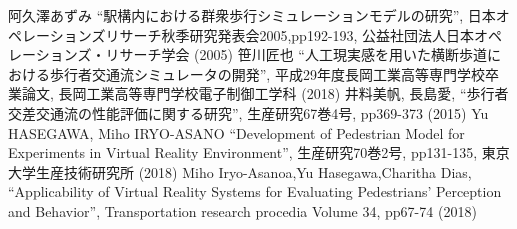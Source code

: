 ﻿%
\begin{thebibliography}{1}
 阿久澤あずみ
``駅構内における群衆歩行シミュレーションモデルの研究'', 日本オペレーションズリサーチ秋季研究発表会2005,pp192-193, 公益社団法人日本オペレーションズ・リサーチ学会
(2005)
 笹川匠也
``人工現実感を用いた横断歩道における歩行者交通流シミュレータの開発'', 平成29年度長岡工業高等専門学校卒業論文, 長岡工業高等専門学校電子制御工学科
(2018)
 井料美帆, 長島愛,
``歩行者交差交通流の性能評価に関する研究'', 生産研究67巻4号, pp369-373
(2015)
 Yu HASEGAWA, Miho IRYO-ASANO
``Development of Pedestrian Model for Experiments in Virtual Reality Environment'', 生産研究70巻2号, pp131-135, 東京大学生産技術研究所 (2018)
 Miho Iryo-Asanoa,Yu Hasegawa,Charitha Dias,
``Applicability of Virtual Reality Systems for Evaluating Pedestrians’ Perception and Behavior'', Transportation research procedia Volume 34, pp67-74
 (2018)
\end{thebibliography}